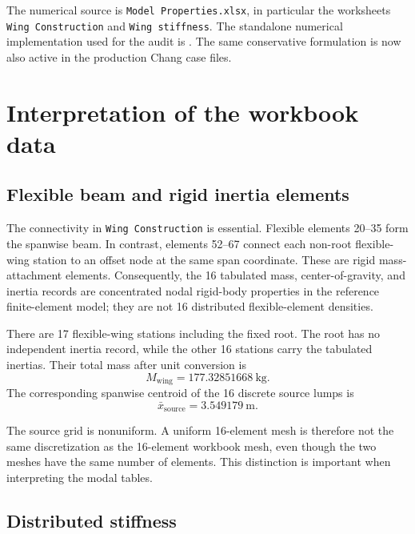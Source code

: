 \documentclass[11pt,a4paper]{article}
\begin{document}
The numerical source is \texttt{Model Properties.xlsx}, in particular the
worksheets \texttt{Wing Construction} and \texttt{Wing stiffness}.  The
standalone numerical implementation used for the audit is
.
The same conservative formulation is now also active in the production Chang
case files.

\section{Interpretation of the workbook data}

\subsection{Flexible beam and rigid inertia elements}

The connectivity in \texttt{Wing Construction} is essential.  Flexible
elements 20--35 form the spanwise beam.  In contrast, elements 52--67 connect
each non-root flexible-wing station to an offset node at the same span
coordinate.  These are rigid mass-attachment elements.  Consequently, the
16 tabulated mass, center-of-gravity, and inertia records are concentrated
nodal rigid-body properties in the reference finite-element model; they are
not 16 distributed flexible-element densities.

There are 17 flexible-wing stations including the fixed root.  The root has
no independent inertia record, while the other 16 stations carry the
tabulated inertias.  Their total mass after unit conversion is
\begin{equation}
M_{\mathrm{wing}} = 177.32851668\ \mathrm{kg}.
\end{equation}
The corresponding spanwise centroid of the 16 discrete source lumps is
\begin{equation}
\bar{x}_{\mathrm{source}} = 3.549179\ \mathrm{m}.
\end{equation}

The source grid is nonuniform.  A uniform 16-element mesh is therefore not
the same discretization as the 16-element workbook mesh, even though the two
meshes have the same number of elements.  This distinction is important when
interpreting the modal tables.

\subsection{Distributed stiffness}
\end{document}
